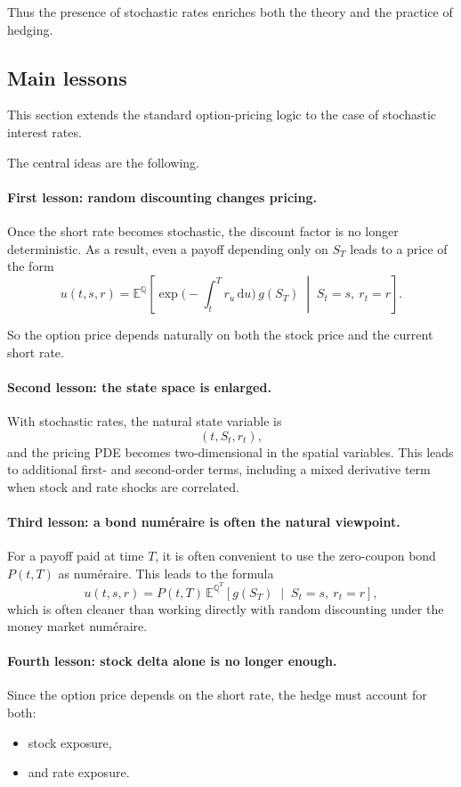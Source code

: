 \documentclass[11pt]{article}
\newcommand{\Qbb}{\mathbb{Q}}
\newcommand{\E}{\mathbb{E}}
\theoremstyle{plain}
\theoremstyle{definition}
\theoremstyle{remark}
\begin{document}
Thus the presence of stochastic rates enriches both the theory and the
practice of hedging.

\subsection{Main lessons}

This section extends the standard option-pricing logic to the case of
stochastic interest rates.

The central ideas are the following.

\paragraph{First lesson: random discounting changes pricing.}
Once the short rate becomes stochastic, the discount factor is no longer
deterministic.
As a result, even a payoff depending only on \(S_T\) leads to a price of
the form
\[
u(t,s,r)
=
\E^\Qbb\!\left[
\exp\!\Big(-\int_t^T r_u\,\mathrm{d}u\Big)\,g(S_T)
\;\middle|\;
S_t=s,\ r_t=r
\right].
\]

So the option price depends naturally on both the stock price and the
current short rate.

\paragraph{Second lesson: the state space is enlarged.}
With stochastic rates, the natural state variable is
\[
(t,S_t,r_t),
\]
and the pricing PDE becomes two-dimensional in the spatial variables.
This leads to additional first- and second-order terms, including a
mixed derivative term when stock and rate shocks are correlated.

\paragraph{Third lesson: a bond numéraire is often the natural viewpoint.}
For a payoff paid at time \(T\), it is often convenient to use the
zero-coupon bond \(P(t,T)\) as numéraire.
This leads to the formula
\[
u(t,s,r)
=
P(t,T)\,
\E^{\Qbb^T}\!\left[
g(S_T)
\;\middle|\;
S_t=s,\ r_t=r
\right],
\]
which is often cleaner than working directly with random discounting
under the money market numéraire.

\paragraph{Fourth lesson: stock delta alone is no longer enough.}
Since the option price depends on the short rate, the hedge must account
for both:
\begin{itemize}[leftmargin=1.4em]
    \item stock exposure,
    \item and rate exposure.
\end{itemize}
\end{document}
